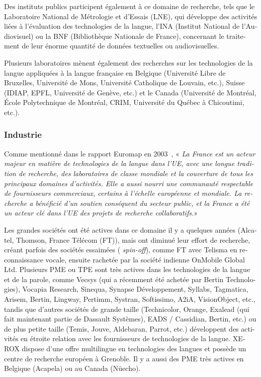 \begin{french}
\begin{multicols}{2}
Des instituts publics participent également à ce domaine de
recherche, tels que le Laboratoire National de Métrologie et d'Essais
(LNE), qui développe des activités liées à l'évaluation des
technologies de la langue, l'INA (Institut National de l'Audiovisuel)
ou la BNF (Bibliothèque Nationale de France), concernant le traitement
de leur énorme quantité de données textuelles ou audiovisuelles.

Plusieurs laboratoires mènent également des recherches sur les
technologies de la langue appliquées à la langue française en Belgique
(Université Libre de Bruxelles, Université de Mons, Université
Catholique de Louvain, etc.), Suisse (IDIAP, EPFL, Université de
Genève, etc.) et le Canada (Université de Montréal, École
Polytechnique de Montréal, CRIM, Université du Québec à Chicoutimi,
etc.).

\subsubsection{Industrie}

Comme mentionné dans le rapport Euromap en 2003~\cite{euromap}, «\textit{ La
France est un acteur majeur en matière de technologies de la langue
dans l'UE, avec une longue tradition de recherche, des laboratoires de
classe mondiale et la couverture de tous les principaux domaines
d'activités. Elle a aussi nourri une communauté respectable de
fournisseurs commerciaux, certains à l'échelle européenne et
mondiale. La recherche a bénéficié d'un soutien conséquent du secteur
public, et la France a été un acteur clé dans l'UE des projets de
recherche collaboratifs.}»

Les grandes sociétés ont été actives dans ce domaine il y a quelques
années (Alcatel, Thomson, France Télécom (FT)), mais ont diminué leur
effort de recherche, créant parfois des sociétés essaimées ({\em
  spin-off}), comme FT avec Telisma en reconnaissance vocale, ensuite
rachetée par la société indienne OnMobile Global Ltd. Plusieurs PME ou
TPE sont très actives dans les technologies de la langue et de la
parole, comme Vecsys (qui a récemment été achetée par Bertin
Technologies), Vocapia Research, Sinequa, Synapse Développement,
Syllabs, Tagmatica, Arisem, Bertin, Lingway, Pertimm, Systran,
Softissimo, A2iA, VisionObject, etc., tandis que d'autres
sociétés de grande taille (Technicolor, Orange, Exalead (qui fait
maintenant partie de Dassault Systèmes), EADS / Cassidian, Bertin,
etc.) ou de plus petite taille (Temis, Jouve, Aldebaran, Parrot, etc.)
développent des activités en étroite relation avec les fournisseurs de
technologies de la langue. XEROX dispose d'une offre multilingue en
technologies des langues et possède un centre de recherche européen à
Grenoble. Il y a aussi des PME très actives en Belgique (Acapela) ou
au Canada (Nüecho).


\end{multicols}
\end{french}
